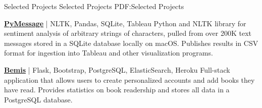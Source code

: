 \documentclass[letterpaper,MMMyyyy,nonstopmode]{simpleresumecv}
\begin{document}
\begin{Body}
\hrulefill
\Section
{Selected Projects}
{Selected Projects}
{PDF:Selected Projects}

\Entry
\href{https://github.com/miloszkowal/PyMessage}
{\textbf{PyMessage}} | NLTK, Pandas, SQLite, Tableau
\hfill
\Gap
Python and NLTK library for sentiment analysis of arbitrary strings of characters, pulled from over 200K text messages stored in a SQLite database locally on macOS. Publishes results in CSV format for ingestion into Tableau and other visualization programs.

\BigGap
\Entry
\href{https://github.com/miloszkowal/bemis}
{\textbf{Bemis}} | Flask, Bootstrap, PostgreSQL, ElasticSearch, Heroku
\hfill
\Gap
Full-stack application that allows users to create personalized accounts and add books they have read. Provides statistics on book readership and stores all data in a PostgreSQL database.







\end{Body}
\end{document}
